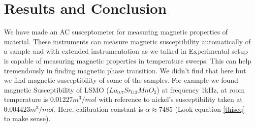 \section{Results and Conclusion}

We have made an AC susceptometer for measuring magnetic properties of material. These instruments can measure magnetic susceptibility automatically of a sample and with extended instrumentation as we talked in Experimental setup is capable of measuring magnetic properties in temperature sweeps. This can help tremendously in finding magnetic phase transition. We didn’t find that here but we find magnetic susceptibility of some of the samples. For example we found magnetic Susceptibility of LSMO ($La_{0.7}Sr_{0.3}MnO_3$) at frequency 1kHz, at room temperature is $0.01227 m^3/mol$ with reference to nickel's susceptibility taken at $0.004423 m^3/mol$\cite{PhysRev.17.678}. Here, calibration constant is $\alpha \approx 7485$ (Look equation \ref{thiseq} to make sense).

